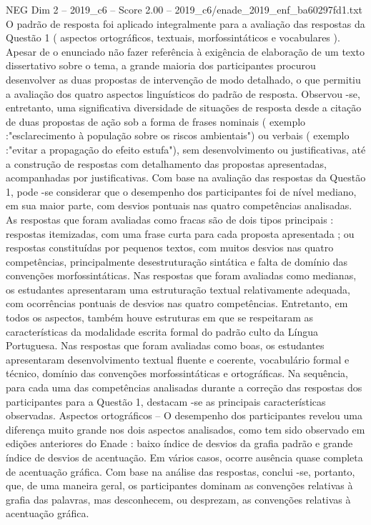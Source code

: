 \begin{textsample}{NEG Dim 2 – 2019\_c6 – Score 2.00 – 2019\_c6/enade\_2019\_enf\_ba60297fd1.txt}
O padrão de resposta foi aplicado integralmente para a avaliação das respostas da Questão 1 ( aspectos ortográficos, textuais, morfossintáticos e vocabulares ).
Apesar de o enunciado não fazer referência à exigência de elaboração de um texto dissertativo sobre o tema, a grande maioria dos participantes procurou desenvolver as duas propostas de intervenção de modo detalhado, o que permitiu a avaliação dos quatro aspectos linguísticos do padrão de resposta.
Observou -se, entretanto, uma significativa diversidade de situações de resposta desde a citação de duas propostas de ação sob a forma de frases nominais ( exemplo :"esclarecimento à população sobre os riscos ambientais") ou verbais ( exemplo :"evitar a propagação do efeito estufa"), sem desenvolvimento ou justificativas, até a construção de respostas com detalhamento das propostas apresentadas, acompanhadas por justificativas.
Com base na avaliação das respostas da Questão 1, pode -se considerar que o desempenho dos participantes foi de nível mediano, em sua maior parte, com desvios pontuais nas quatro competências analisadas.
As respostas que foram avaliadas como fracas são de dois tipos principais : respostas itemizadas, com uma frase curta para cada proposta apresentada ; ou respostas constituídas por pequenos textos, com muitos desvios nas quatro competências, principalmente desestruturação sintática e falta de domínio das convenções morfossintáticas.
Nas respostas que foram avaliadas como medianas, os estudantes apresentaram uma estruturação textual relativamente adequada, com ocorrências pontuais de desvios nas quatro competências.
Entretanto, em todos os aspectos, também houve estruturas em que se respeitaram as características da modalidade escrita formal do padrão culto da Língua Portuguesa.
Nas respostas que foram avaliadas como boas, os estudantes apresentaram desenvolvimento textual fluente e coerente, vocabulário formal e técnico, domínio das convenções morfossintáticas e ortográficas.
Na sequência, para cada uma das competências analisadas durante a correção das respostas dos participantes para a Questão 1, destacam -se as principais características observadas.
Aspectos ortográficos – O desempenho dos participantes revelou uma diferença muito grande nos dois aspectos analisados, como tem sido observado em edições anteriores do Enade : baixo índice de desvios da grafia padrão e grande índice de desvios de acentuação.
Em vários casos, ocorre ausência quase completa de acentuação gráfica.
Com base na análise das respostas, conclui -se, portanto, que, de uma maneira geral, os participantes dominam as convenções relativas à grafia das palavras, mas desconhecem, ou desprezam, as convenções relativas à acentuação gráfica.

\end{textsample}

